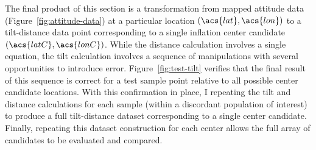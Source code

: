 The final product of this section is a transformation from mapped attitude data (Figure~\ref{fig:attitude-data}) at a particular location $(\acs{lat}, \acs{lon})$ to a tilt-distance data point corresponding to a single inflation center candidate $(\acs{latC}, \acs{lonC})$. While the distance calculation involves a single equation, the tilt calculation involves a sequence of manipulations with several opportunities to introduce error. Figure~\ref{fig:test-tilt} verifies that the final result of this sequence is correct for a test sample point relative to all possible center candidate locations. With this confirmation in place, I repeating the tilt and distance calculations for each sample (within a discordant population of interest) to produce a full tilt-distance dataset corresponding to a single center candidate. Finally, repeating this dataset construction for each center allows the full array of candidates to be evaluated and compared.